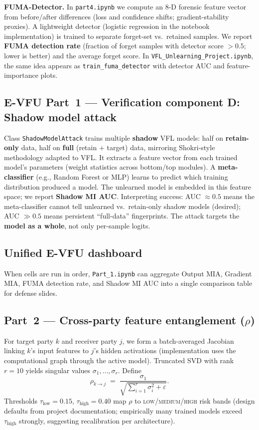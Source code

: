 \documentclass[sigconf,nonacm]{acmart}
\begin{document}
\textbf{FUMA-Detector.} In \texttt{part4.ipynb} we compute an 8-D forensic feature vector from before/after differences (loss and confidence shifts; gradient-stability proxies). A lightweight detector (logistic regression in the notebook implementation) is trained to separate forget-set vs.\ retained samples. We report \textbf{FUMA detection rate} (fraction of forget samples with detector score $>0.5$; lower is better) and the average forget score. In \texttt{VFL\_Unlearning\_Project.ipynb}, the same idea appears as \texttt{train\_fuma\_detector} with detector AUC and feature-importance plots.

\subsection{E-VFU Part~1 --- Verification component D: Shadow model attack}
Class \texttt{ShadowModelAttack} trains multiple \textbf{shadow} VFL models: half on \textbf{retain-only} data, half on \textbf{full} (retain $+$ target) data, mirroring Shokri-style methodology adapted to VFL. It extracts a feature vector from each trained model's parameters (weight statistics across bottom/top modules). A \textbf{meta-classifier} (e.g., Random Forest or MLP) learns to predict which training distribution produced a model. The unlearned model is embedded in this feature space; we report \textbf{Shadow MI AUC}. Interpreting success: AUC $\approx 0.5$ means the meta-classifier cannot tell unlearned vs.\ retain-only shadow models (desired); AUC $\gg 0.5$ means persistent ``full-data'' fingerprints. The attack targets the \textbf{model as a whole}, not only per-sample logits.

\subsection{Unified E-VFU dashboard}
When cells are run in order, \texttt{Part\_1.ipynb} can aggregate Output MIA, Gradient MIA, FUMA detection rate, and Shadow MI AUC into a single comparison table for defense slides.

\subsection{Part~2 --- Cross-party feature entanglement ($\rho$)}
For target party $k$ and receiver party $j$, we form a batch-averaged Jacobian linking $k$'s input features to $j$'s hidden activations (implementation uses the computational graph through the active model). Truncated SVD with rank $r{=}10$ yields singular values $\sigma_1,\ldots,\sigma_r$. Define
\begin{equation}
  \rho_{k\to j} \;=\; \frac{\sigma_1}{\sqrt{\sum_{i=1}^{r}\sigma_i^2 + \varepsilon}}.
\end{equation}
Thresholds $\tau_{\mathrm{low}}{=}0.15$, $\tau_{\mathrm{high}}{=}0.40$ map $\rho$ to \textsc{low/medium/high} risk bands (design defaults from project documentation; empirically many trained models exceed $\tau_{\mathrm{high}}$ strongly, suggesting recalibration per architecture).
\end{document}
